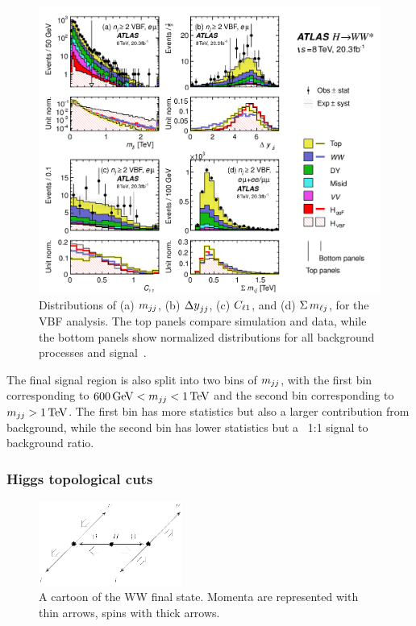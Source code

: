 \begin{figure}
  \centering
  \captionsetup{justification=centering}
  \includegraphics[width=\textwidth]{figures/VBF_vars}
  \caption{Distributions of (a) $m_{jj}$, (b) $\dyjj$, (c) $C_{\ell1}$, and (d) $\Sigma\,m_{\ell j}$, for the VBF analysis. The top panels compare simulation and data, while the bottom panels show normalized distributions for all background processes and signal~\cite{WW2015}.}
  \label{fig:vbfvars}
\end{figure}

The final signal region is also split into two bins of $m_{jj}$, with the first bin corresponding to $600 \GeV < \mjj < 1 \TeV$ and the second bin corresponding to $\mjj > 1 \TeV$. The first bin has more statistics but also a larger contribution from background, while the second bin has lower statistics but a ~1:1 signal to background ratio. 


\subsubsection{Higgs topological cuts}

\begin{figure}[h!]
  \vspace{20pt}
  \centering
  \hspace*{-32pt}
  \includegraphics[width=0.42\textwidth]{figures/ww_spins}
  \caption{A cartoon of the WW final state. Momenta are represented with thin arrows, spins with thick arrows. ~\cite{WW2015}}
  \label{fig:HWWdiagram}
\end{figure}

